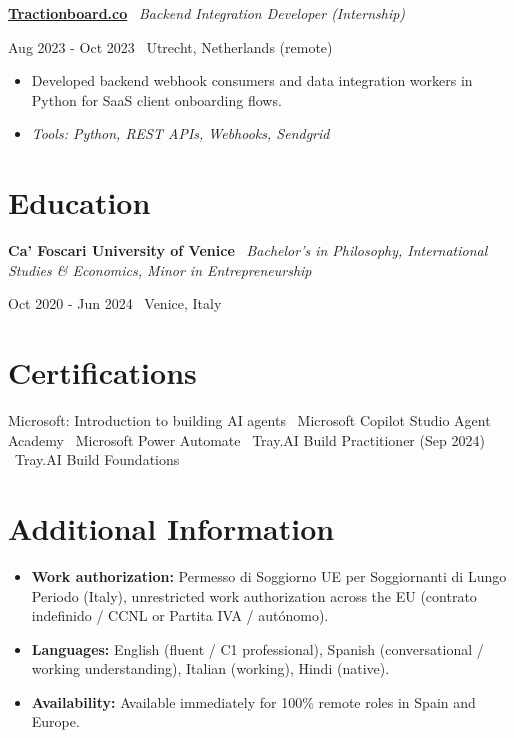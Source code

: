 \documentclass[a4paper,10pt]{article}
\newcommand{\role}[4]{%
  \vspace{2pt}\noindent
  \begin{minipage}[t]{0.70\textwidth}\raggedright\textbf{#1} \textbullet\ \textit{#3}\end{minipage}%
  \hfill
  \begin{minipage}[t]{0.28\textwidth}\raggedleft\footnotesize\color{gray}#2 \textbullet\ #4\end{minipage}%
  \vspace{1pt}%
}
\begin{document}
\role{\href{https://tractionboard.co}{Tractionboard.co}}{Aug 2023 - Oct 2023}{Backend Integration Developer (Internship)}{Utrecht, Netherlands (remote)}
\begin{itemize}
  \item Developed backend webhook consumers and data integration workers in Python for SaaS client onboarding flows.
  \item \textit{Tools: Python, REST APIs, Webhooks, Sendgrid}
\end{itemize}

\section{Education}
\role{Ca' Foscari University of Venice}{Oct 2020 - Jun 2024}{Bachelor's in Philosophy, International Studies \& Economics, Minor in Entrepreneurship}{Venice, Italy}

\section{Certifications}
Microsoft: Introduction to building AI agents \textbullet\ Microsoft Copilot Studio Agent Academy \textbullet\ Microsoft Power Automate \textbullet\ Tray.AI Build Practitioner (Sep 2024) \textbullet\ Tray.AI Build Foundations

\section{Additional Information}
\begin{itemize}
  \item \textbf{Work authorization:} Permesso di Soggiorno UE per Soggiornanti di Lungo Periodo (Italy), unrestricted work authorization across the EU (contrato indefinido / CCNL or Partita IVA / autónomo).
  \item \textbf{Languages:} English (fluent / C1 professional), Spanish (conversational / working understanding), Italian (working), Hindi (native).
  \item \textbf{Availability:} Available immediately for 100\% remote roles in Spain and Europe.
\end{itemize}

\end{document}
